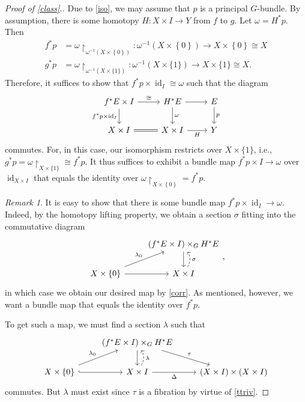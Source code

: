 \documentclass[10pt,letterpaper,cm]{nupset}
\theoremstyle{definition}
\theoremstyle{theorem}
\theoremstyle{remark}
\newtheorem{remark}[defn]{Remark}
\newcommand{\1}{\mathbb{1}}
\newcommand{\0}{\vec 0}
\DeclareMathOperator{\id}{id}
\begin{document}
\begin{proof}[Proof of \cref{class}.]
Due to \cref{iso},  we may assume that $p$ is a principal $G$-bundle.  By assumption, there is some homotopy $H : X \times I \to Y$ from $f$ to $g$.
Let $\omega=  H^{\ast}{p}$. Then 
\begin{align*}
f^{\ast}{p} &  = \omega\restriction_{\omega^{-1}\left(X\times \left\{0\right\}\right)} : \omega^{-1}\left(X\times \left\{0\right\}\right) \to X\times \left\{0\right\} \cong X
\\ g^{\ast}{p}  & = \omega\restriction_{ \omega^{-1}\left(X\times \{1\}\right) } : \omega^{-1}\left(X\times \{1\}\right) \to X\times \{1\} \cong X.
\end{align*}
Therefore, it suffices to show that $f^{\ast}{p}\times \id_I \cong \omega $ such that the diagram
\[
\begin{tikzcd}
f^{\ast}{E}\times I \arrow[r, "\cong"]  \arrow[d, "f^{\ast}{p}\times \id_I"']                        & H^{\ast}{E} \arrow[r] \arrow[d, "\omega"] & E \arrow[d, "p"] \\
X\times I \arrow[r, equals] & X\times I \arrow[r, "H"']                      & Y               
\end{tikzcd}
\] commutes. For, in this case, our isomorphism restricts over $X \times \{1\}$, i.e., $g^{\ast}{p} = \omega\restriction_{X\times \{1\}} \cong f^{\ast}{p}$. It thus suffices to exhibit a bundle map $f^{\ast}{p} \times I\to \omega $ over $\id_{X \times I}$ that equals the identity over $\omega\restriction_{X\times \left\{0\right\}} = f^{\ast}{p}$.

\begin{remark}
It is easy to show that there is some bundle map $f^{\ast}{p}\times \id_I \to \omega$.  Indeed, by the homotopy lifting property, we obtain a section $\sigma$ fitting into the commutative diagram
\[
\begin{tikzcd}
                                   & \left(f^{\ast}{E}\times I\right) \times_G H^{\ast}{E} \arrow[d] \\
X\times \left\{0\right\} \arrow[r] \arrow[ru, "\lambda_0"] & X\times I \arrow[u, "\sigma"', dashed, bend right]             
\end{tikzcd}
,\] in which case we obtain our desired map by \cref{corr}. As mentioned, however, we want a bundle map that  equals the identity over $f^{\ast}{p}$.
\end{remark}

To get such a map, we must find a section $\lambda$ such that
\[
\begin{tikzcd}
                                                      & \left(f^{\ast}{E} \times I\right) \times_G H^{\ast}{E} \arrow[rd, "\tau"] \arrow[d] &                                                       \\
X\times \left\{0\right\} \arrow[ru, "\lambda_0"] \arrow[r, hook] & X\times I \arrow[r, "\Delta"'] \arrow[u, "\lambda"', dashed, bend right]            & \left(X\times I\right) \times \left(X \times I\right)
\end{tikzcd}
\] commutes. But  $\lambda$ must exist since $\tau$ is a fibration by virtue of \cref{ttriv}. 

\end{proof}
\end{document}
